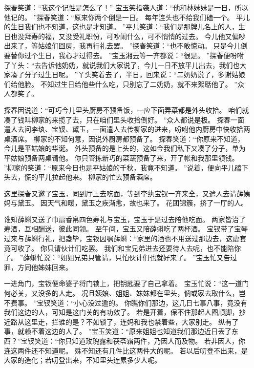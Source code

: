 探春笑道：“我这个记性是怎么了！”
宝玉笑指袭人道：“他和林妹妹是一日，所以他记的。
”探春笑道：“原来你两个倒是一日。
每年连头也不给我们磕一个。
平儿的生日我们也不知道，这也是才知道。
”平儿笑道：“我们是那牌儿名上的人，生日也没拜寿的福，又没受礼职份，可吵闹什么，可不悄悄的过去。
今儿他又偏吵出来了，等姑娘们回房，我再行礼去罢。
”探春笑道：“也不敢惊动。
只是今儿倒要替你过个生日，我心才过得去。
”宝玉湘云等一齐都说：“很是。
”探春便吩咐了丫头：“去告诉他奶奶，就说我们大家说了，今儿一日不放平儿出去，我们也大家凑了分子过生日呢。
”丫头笑着去了，半日，回来说：“二奶奶说了，多谢姑娘们给他脸。
不知过生日给他些什么吃，只别忘了二奶奶，就不来絮聒他了。
”众人都笑了。
\par
探春因说道：“可巧今儿里头厨房不预备饭，一应下面弄菜都是外头收拾。
咱们就凑了钱叫柳家的来揽了去，只在咱们里头收拾倒好。
”众人都说是极。
探春一面遣人去问李纨、宝钗、黛玉，一面遣人去传柳家的进来，吩咐他内厨房中快收拾两桌酒席。
柳家的不知何意，因说外厨房都预备了。
探春笑道：“你原来不知道，今儿是平姑娘的华诞。
外头预备的是上头的，这如今我们私下又凑了分子，单为平姑娘预备两桌请他。
你只管拣新巧的菜蔬预备了来，开了帐和我那里领钱。
”柳家的笑道：“原来今日也是平姑娘的千秋，我竟不知道。
”说着，便向平儿磕下头去，慌的平儿拉起他来。
柳家的忙去预备酒席。
\par
这里探春又邀了宝玉，同到厅上去吃面，等到李纨宝钗一齐来全，又遣人去请薛姨妈与黛玉。
因天气和暖，黛玉之疾渐愈，故也来了。
花团锦簇，挤了一厅的人。
\par
谁知薛蝌又送了巾扇香帛四色寿礼与宝玉，宝玉于是过去陪他吃面。
两家皆治了寿酒，互相酬送，彼此同领。
至午间，宝玉又陪薛蝌吃了两杯酒。
宝钗带了宝琴过来与薛蝌行礼，把盏毕，宝钗因嘱薛蝌：“家里的酒也不用送过那边去，这虚套竟可收了。
你只请伙计们吃罢。
我们和宝兄弟进去还要待人去呢，也不能陪你了。
”薛蝌忙说：“姐姐兄弟只管请，只怕伙计们也就好来了。
”宝玉忙又告过罪，方同他姊妹回来。
\par
一进角门，宝钗便命婆子将门锁上，把钥匙要了自己拿着。
宝玉忙说：“这一道门何必关，又没多的人走。
况且姨娘、姐姐、妹妹都在里头，倘或家去取什么，岂不费事。
”宝钗笑道：“小心没过逾的。
你瞧你们那边，这几日七事八事，竟没有我们这边的人，可知是这门关的有功效了。
若是开着，保不住那起人图顺脚，抄近路从这里走，拦谁的是？不如锁了，连妈和我也禁着些，大家别走。
纵有了事，就赖不着这边的人了。
”宝玉笑道：“原来姐姐也知道我们那边近日丢了东西？”宝钗笑道：“你只知道玫瑰露和茯苓霜两件，乃因人而及物。
若非因人，你连这两件还不知道呢。
殊不知还有几件比这两件大的呢。
若以后叨登不出来，是大家的造化；若叨登出来，不知里头连累多少人呢。
